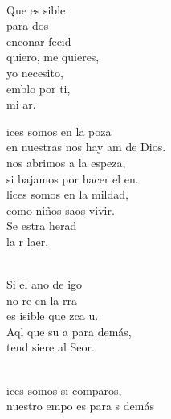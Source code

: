 \documentclass[12pt]{article}
\begin{document}
\begin{multicols*}{2}
\begin{cancion}
	\jump\\
	Que es sible\\
	para dos \\
	enconar fecid\\
	quiero, me quieres,\\
	yo  necesito,\\
	emblo por ti,\\
	mi ar.\\
\end{cancion}%

\begin{cancion}[Bienaventuranzas][Kairoi]%
	ices somos en la poza\\
	en nuestras nos hay am de Dios.\\
	nos abrimos a la espeza,\\
	si bajamos por hacer el en.\\
	lices somos en la mildad,\\
	como niños saos vivir.\\
	Se estra herad\\
	la r laer.\\\jump\\
	\begin{chorus}%
	Si el ano de igo \\
	no re en la rra\\
	es isible que zca u.\\
	Aql que  su a para  demás,\\
	tend siere al Seor.\\
	\end{chorus}%
	\jump\\
	ices somos si comparos,\\
	nuestro empo es para s demás\\

\end{cancion}
\end{multicols*}
\end{document}
